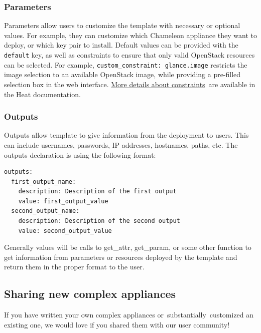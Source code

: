 \subsubsection{Parameters}\label{parameters}

Parameters allow users to customize the template with necessary or
optional values. For example, they can customize which Chameleon
appliance they want to deploy, or which key pair to install. Default
values can be provided with the \texttt{default} key, as well as
constraints to ensure that only valid OpenStack resources can be
selected. For example, \texttt{custom\_constraint:\ glance.image}
restricts the image selection to an available OpenStack image, while
providing a pre-filled selection box in the web interface.
\href{http://docs.openstack.org/developer/heat/template_guide/hot_spec.html\#parameter-constraints}{More
details about constraints}~are available in the Heat documentation.

\subsubsection{Outputs}\label{outputs}

Outputs allow template to give information from the deployment to users.
This can include usernames, passwords, IP addresses, hostnames, paths,
etc. The outputs declaration is using the following format:

\begin{footnotesize}
\begin{verbatim}
outputs:
  first_output_name:
    description: Description of the first output
    value: first_output_value
  second_output_name:
    description: Description of the second output
    value: second_output_value
\end{verbatim}
\end{footnotesize}

Generally values will be calls to get\_attr, get\_param, or some other
function to get information from parameters or resources deployed by the
template and return them in the proper format to the user.

\subsection{Sharing new complex
appliances}\label{sharing-new-complex-appliances}

If you have written your own complex appliances
or~substantially~customized an existing one, we would love if you shared
them with our user community!

